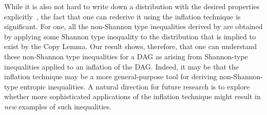 {While it is also not hard to write down a distribution with the desired properties explicitly~\cite[Lemma~15.8]{yeung_network_2008}, the fact that one can rederive it using the inflation technique is significant.  For one, all the non-Shannon type inequalities derived by \citet{zeger_2011_nonshannon} are obtained by applying some Shannon type inequality to the distribution that is implied to exist by the Copy Lemma.  Our result shows, therefore, that one can understand these non-Shannon type inequalities for a DAG as arising from Shannon-type inequalities applied to an inflation of the DAG.  Indeed, it may be that the inflation technique may be a more general-purpose tool for deriving non-Shannon-type entropic inequalities.  A natural direction for future research is to explore whether more sophisticated applications of the inflation technique might result  in \emph{new} examples of such inequalities. 


}
